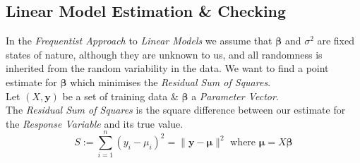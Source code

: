 \documentclass[11pt,a4paper]{article}
\begin{document}
\subsection{Linear Model Estimation \& Checking}

In the \textit{Frequentist Approach} to \textit{Linear Models} we assume that $\pmb\beta$ and $\sigma^2$ are fixed states of nature, although they are unknown to us, and all randomness is inherited from the random variability in the data. We want to find a point estimate for $\pmb\beta$ which minimises the \textit{Residual Sum of Squares}.\\

Let $(X,\textbf{y})$  be a set of training data \& $\pmb\beta$ a \textit{Parameter Vector}.\\
The \textit{Residual Sum of Squares} is the square difference between our estimate for the \textit{Response Variable} and its true value.
$$S:=\sum_{i=1}^n(y_i-\mu_i)^2=\|\textbf{y}-\pmb\mu\|^2\text{ where }\pmb\mu=X\pmb\beta$$
\end{document}
